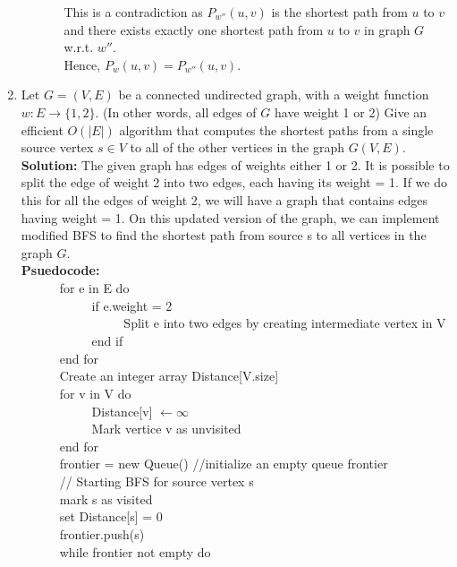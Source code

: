 \documentclass[12pt]{article}
\begin{document}
\begin{enumerate}
\begin{enumerate}
\begin{enumerate}
This is a contradiction as $P_{w''}(u,v)$ is the shortest path from $u$ to $v$ and there exists exactly one shortest path from $u$ to $v$ in graph $G$ w.r.t. $w''$.\\
Hence, $P_{w}(u,v) = P_{w''}(u,v)$.\\
\end{enumerate}
\end{enumerate}
\pagebreak
\item Let $G = (V,E)$ be a connected undirected graph, with a weight function $w : E \rightarrow \{1,2\}$. (In other words, all edges of $G$ have weight 1 or 2) Give an efficient $O(|E|)$ algorithm that computes the shortest paths from a single source vertex $s \in V$ to all of the other vertices in the graph $G(V,E)$.\\ 
\textbf{Solution:} The given graph has edges of weights either 1 or 2. It is possible to split the edge of weight 2 into two edges, each having its weight = 1. If we do this for all the edges of weight 2, we will have a graph that contains edges having weight = 1. On this updated version of the graph, we can implement modified BFS to find the shortest path from source s to all vertices in the graph $G$.  \\
\textbf{Psuedocode:}\\
\verb|		|for e in E do\\
\verb|		|\verb|		|if e.weight = 2\\
\verb|		|\verb|		|\verb|		|Split e into two edges by creating intermediate vertex in V\\
\verb|		|\verb|		|end if\\
\verb|		|end for\\
\verb|		|Create an integer array Distance[V.size]\\
\verb|		|for v in V do\\
\verb|		|\verb|		|Distance[v] $\leftarrow \infty$\\
\verb|		|\verb|		|Mark vertice v as unvisited\\
\verb|		|end for\\
\verb|		|frontier = new Queue() //initialize an empty queue frontier\\
\verb|		|// Starting BFS for source vertex s\\
\verb|		|mark s as visited\\
\verb|		|set Distance[s] = 0\\
\verb|		|frontier.push(s)\\
\verb|		|while frontier not empty do\\

\end{enumerate}
\end{document}

